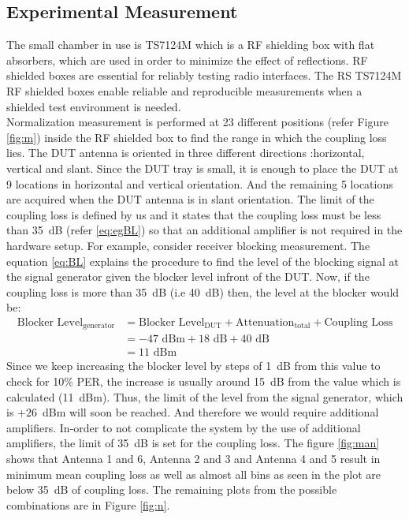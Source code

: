 \subsection{Experimental Measurement} 
The small chamber in use is TS7124M which is a \acs{RF} shielding box with flat absorbers, which are used in order to minimize the effect of reflections. \acs{RF} shielded boxes are essential for reliably testing radio interfaces. The \acs{RS}\textregistered{} TS7124M \acs{RF} shielded boxes enable reliable and reproducible measurements when a shielded test environment is needed. \\

Normalization measurement is performed at 23 different positions (refer Figure \ref{fig:m}) inside the RF shielded box to find the range in which the coupling loss lies. The \acs{DUT} antenna is oriented in three different directions :horizontal, vertical and slant. Since the \acs{DUT} tray is small, it is enough to place the \acs{DUT} at 9 locations in horizontal and vertical orientation. And the remaining 5 locations are acquired when the \acs{DUT} antenna is in slant orientation. The limit of the coupling loss is defined by us and it states that the coupling loss must be less than 35~dB (refer \ref{eq:egBL}) so that an additional amplifier is not required in the hardware setup. For example, consider receiver blocking measurement. The equation \ref{eq:BL} explains the procedure to find the level of the blocking signal at the signal generator given the blocker level infront of the \acs{DUT}. Now, if the coupling loss is more than 35~dB (i.e 40~dB) then, the level at the blocker would be:
\begin{equation} 
\begin{split}
\mbox{Blocker Level}_{\mbox{generator}}  &= \mbox{Blocker Level}_{\mbox{DUT}} + \mbox{Attenuation}_{\mbox{total}} + \mbox{Coupling Loss} \label{eq:egBL} \\
& = -47 \mbox{~dBm} + 18 \mbox{~dB} + 40 \mbox{~dB} \\
& = 11 \mbox{~dBm} 
\end{split}
\end{equation}
Since we keep increasing the blocker level by steps of 1~dB from this value to check for 10\% \acs{PER}, the increase is usually around 15~dB from the value which is calculated (11~dBm). Thus, the limit of the level from the signal generator, which is +26~dBm will soon be reached. And therefore we would require additional amplifiers. In-order to not complicate the system by the use of additional amplifiers, the limit of 35~dB is set for the coupling loss. The figure \ref{fig:man} shows that Antenna 1 and 6, Antenna 2 and 3 and Antenna 4 and 5 result in minimum mean coupling loss as well as almost all bins as seen in the plot are below 35~dB of coupling loss. The remaining plots from the possible combinations are in Figure \ref{fig:n}.

